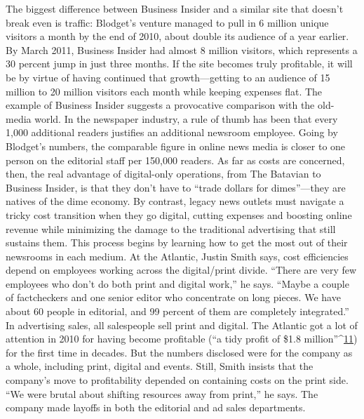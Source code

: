 
The biggest difference between Business Insider and a similar site that doesn’t
break even is traffic: Blodget’s venture managed to pull in 6 million unique visitors
a month by the end of 2010, about double its audience of a year earlier. By
March 2011, Business Insider had almost 8 million visitors, which represents a 30
percent jump in just three months. If the site becomes truly profitable, it will be
by virtue of having continued that growth—getting to an audience of 15 million
to 20 million visitors each month while keeping expenses flat.
The example of Business Insider suggests a provocative comparison with the
old-media world. In the newspaper industry, a rule of thumb has been that every
1,000 additional readers justifies an additional newsroom employee. Going by
Blodget’s numbers, the comparable figure in online news media is closer to one
person on the editorial staff per 150,000 readers.
As far as costs are concerned, then, the real advantage of digital-only operations,
from The Batavian to Business Insider, is that they don’t have to ``trade
dollars for dimes''—they are natives of the dime economy. By contrast, legacy
news outlets must navigate a tricky cost transition when they go digital, cutting
expenses and boosting online revenue while minimizing the damage to the traditional
advertising that still sustains them.
This process begins by learning how to get the most out of their newsrooms
in each medium. At the Atlantic, Justin Smith says, cost efficiencies depend on
employees working across the digital/print divide. ``There are very few employees
who don’t do both print and digital work,'' he says. ``Maybe a couple of factcheckers
and one senior editor who concentrate on long pieces. We have about
60 people in editorial, and 99 percent of them are completely integrated.'' In
advertising sales, all salespeople sell print and digital.
The Atlantic got a lot of attention in 2010 for having become profitable (``a
tidy profit of \$1.8 million''^{\href{#endnotes-ch7}{11}}) for the first time in decades. But the numbers disclosed
were for the company as a whole, including print, digital and events. Still,
Smith insists that the company’s move to profitability depended on containing
costs on the print side. ``We were brutal about shifting resources away from print,''
he says. The company made layoffs in both the editorial and ad sales departments.
